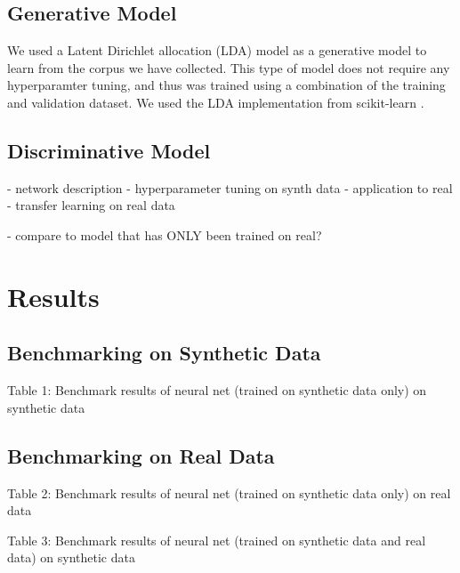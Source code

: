 \documentclass[11pt]{article}
\begin{document}
\subsection{Generative Model}
We used a Latent Dirichlet allocation (LDA) model as a generative model to learn from the corpus we have collected. This type of model does not require any hyperparamter tuning, and thus was trained using a combination of the training and validation dataset. We used the LDA implementation from scikit-learn \cite{sklearn}. 


\subsection{Discriminative Model}
- network description
- hyperparameter tuning on synth data
- application to real
- transfer learning on real data

- compare to model that has ONLY been trained on real?

\section{Results}
\subsection{Benchmarking on Synthetic Data}

\begin{center}
	
\end{center}
Table 1: Benchmark results of neural net (trained on synthetic data only) on synthetic data


\subsection{Benchmarking on Real Data}

\begin{center}

\end{center}
Table 2: Benchmark results of neural net (trained on synthetic data only) on real data



\begin{center}

\end{center}
Table 3: Benchmark results of neural net (trained on synthetic data and real data) on synthetic data
\end{document}
